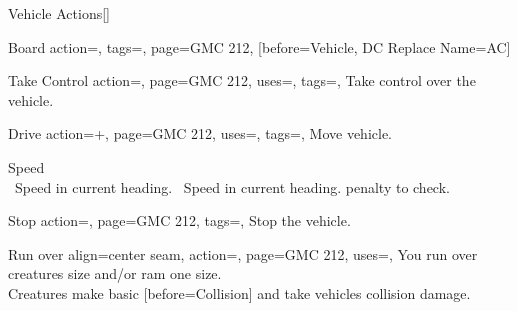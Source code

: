 \begin{PageBackLandscape}
\begin{TablesHalf}{\backTableHeight}
\begin{Table}{Vehicle Actions}[]
\begin{entry}{Board}{%
                action=,
                tags=\Move,
                page=GMC 212,
            }
                [before=Vehicle, DC Replace Name=AC]
            \end{entry}
            \begin{entry}{Take Control}{%
                action=,
                page=GMC 212,
                uses=\Piloting,
                tags=\Manipulate,
            }
                Take control over the vehicle. \hfill{} \hfill
            \end{entry}
            \begin{entry}{Drive}{%
                action=+,
                page=GMC 212,
                uses=\Piloting,
                tags=\Move,
            }
                Move vehicle.\hfill
                \begin{minipage}[c]{0.78\linewidth}
                     Speed \quad{} \quad {}\quad {} \\
                    \Reck\, Speed in current heading.\hfill
                    \Reck\, Speed in current heading.  penalty to check.
                \end{minipage}
            \end{entry}
            \begin{entry}{Stop}{%
                action=,
                page=GMC 212,
                tags=\Manipulate,
            }
                Stop the vehicle.
            \end{entry}
            \begin{entry}{Run over}{%
                align=center seam,
                action=,
                page=GMC 212,
                uses={\Piloting[tags=R]},
            }
                You run over creatures  size and/or ram one  size. \hfill
                \\
                Creatures make basic [before=Collision] and take vehicles collision damage. \hfill
            \end{entry}
        \end{Table}
    \end{TablesHalf}%

\end{PageBackLandscape}
